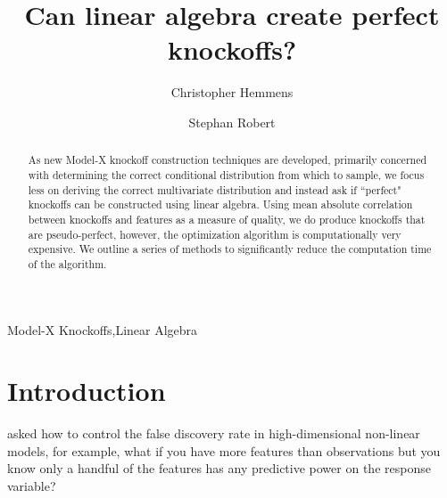 \documentclass[review]{elsarticle}
\begin{document}
\begin{frontmatter}

\title{Can linear algebra create perfect knockoffs?}

\author{Christopher Hemmens}
\author{Stephan Robert}
\address{HEIG-VD, Rue de Galilée 15, 1400 Yverdon-les-Bains, Switzerland}




\begin{abstract}
As new Model-X knockoff construction techniques are developed, primarily concerned with determining the correct conditional distribution from which to sample, we focus less on deriving the correct multivariate distribution and instead ask if ``perfect" knockoffs can be constructed using linear algebra. Using mean absolute correlation between knockoffs and features as a measure of quality, we do produce knockoffs that are pseudo-perfect, however, the optimization algorithm is computationally very expensive. We outline a series of methods to significantly reduce the computation time of the algorithm.
\end{abstract}

\begin{keyword}
Model-X Knockoffs\sep Linear Algebra
\end{keyword}

\end{frontmatter}


\section{Introduction}

\citet{candes2018panning} asked how to control the false discovery rate in high-dimensional non-linear models, for example, what if you have more features than observations but you know only a handful of the features has any predictive power on the response variable?
\end{document}
